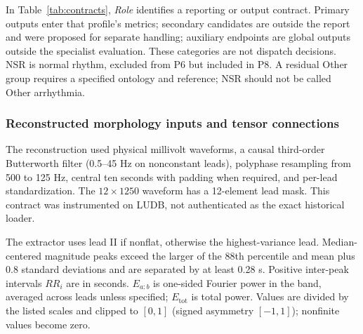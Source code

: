 In Table~\ref{tab:contracts}, \emph{Role} identifies a reporting or output contract. Primary outputs enter that profile's metrics; secondary candidates are outside the report and were proposed for separate handling; auxiliary endpoints are global outputs outside the specialist evaluation. These categories are not dispatch decisions. NSR is normal rhythm, excluded from P6 but included in P8. A residual Other group requires a specified ontology and reference; NSR should not be called Other arrhythmia.

\subsubsection{Reconstructed morphology inputs and tensor connections}
\label{sec:morphology}

The reconstruction used physical millivolt waveforms, a causal third-order Butterworth filter (0.5--45 Hz on nonconstant leads), polyphase resampling from 500 to 125 Hz, central ten seconds with padding when required, and per-lead standardization. The $12\times1250$ waveform has a 12-element lead mask. This contract was instrumented on LUDB, not authenticated as the exact historical loader.

The extractor uses lead II if nonflat, otherwise the highest-variance lead. Median-centered magnitude peaks exceed the larger of the 88th percentile and mean plus 0.8 standard deviations and are separated by at least 0.28 s. Positive inter-peak intervals $RR_i$ are in seconds. $E_{a:b}$ is one-sided Fourier power in the band, averaged across leads unless specified; $E_{\mathrm{tot}}$ is total power. Values are divided by the listed scales and clipped to $[0,1]$ (signed asymmetry $[-1,1]$); nonfinite values become zero.

